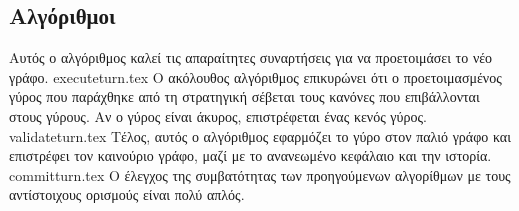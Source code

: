 \subsection{Αλγόριθμοι}
  Αυτός ο αλγόριθμος καλεί τις απαραίτητες συναρτήσεις για να προετοιμάσει το νέο γράφο.
  {executeturn.tex}
  Ο ακόλουθος αλγόριθμος επικυρώνει ότι ο προετοιμασμένος γύρος που παράχθηκε από τη στρατηγική σέβεται τους κανόνες που
  επιβάλλονται στους γύρους. Αν ο γύρος είναι άκυρος, επιστρέφεται ένας κενός γύρος.
  {validateturn.tex}
  Τέλος, αυτός ο αλγόριθμος εφαρμόζει το γύρο στον παλιό γράφο και επιστρέφει τον καινούριο γράφο, μαζί με το ανανεωμένο
  κεφάλαιο και την ιστορία.
  {committurn.tex}
  Ο έλεγχος της συμβατότητας των προηγούμενων αλγορίθμων με τους αντίστοιχους ορισμούς είναι πολύ απλός.
